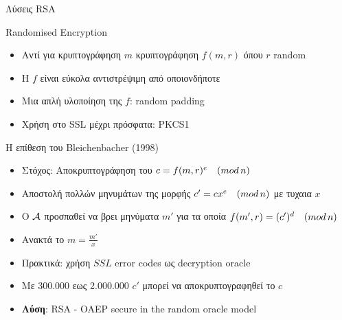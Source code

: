 \documentclass{beamer}
\begin{document}
\begin{frame}[allowframebreaks]{Λύσεις RSA}
\begin{block}{Randomised Encryption}
\begin{itemize}
\item Αντί για κρυπτογράφηση $m$ κρυπτογράφηση $f(m,r)$ όπου $r$ random
\item Η $f$ είναι εύκολα αντιστρέψιμη από οποιονδήποτε
\item Μια απλή υλοποίηση της $f$: random padding
\item Χρήση στο SSL μέχρι πρόσφατα: PKCS1
\end{itemize}
\end{block}

\begin{block}{Η επίθεση του Bleichenbacher (1998) \cite{Bleichenbacher98chosenciphertext}}
\begin{itemize}
\item Στόχος: Αποκρυπτογράφηση του $c = f(m,r)^e \quad (mod \, {n})$
\item Αποστολή πολλών μηνυμάτων της μορφής $ c'= c x^e \quad (mod \, {n})$ με τυχαια $x$
\item O $\mathcal{A}$ προσπαθεί να βρει μηνύματα $m'$ για τα οποία $f(m',r) = (c')^d \quad (mod \, {n})$
\item Ανακτά το $m = \frac{m'}{x}$ 
\item Πρακτικά: χρήση $SSL$ error codes ως decryption oracle
\item Με 300.000 εως 2.000.000 $c'$ μπορεί να αποκρυπτογραφηθεί το $c$
\item \textbf{Λύση}: RSA - OAEP secure in the random oracle model \cite{Bellare95optimalasymmetric}
\end{itemize}
\end{block}
 
\end{frame}
\end{document}
